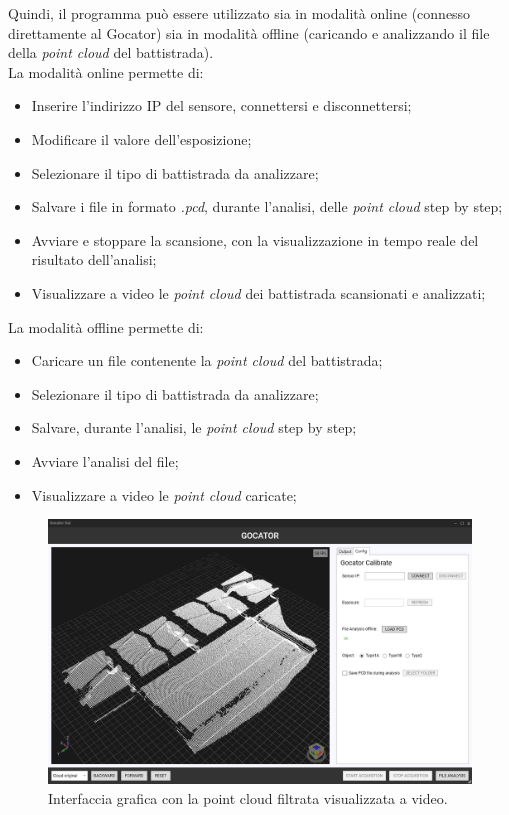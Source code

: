 \noindent Quindi, il programma può essere utilizzato sia in modalità online (connesso direttamente al Gocator) sia in modalità offline (caricando e analizzando il file della \textit{point cloud} del battistrada).\\
\newline
La modalità online permette di:

\begin{itemize}
	\item Inserire l'indirizzo IP del sensore, connettersi e disconnettersi;
	\item Modificare il valore dell'esposizione;
	\item Selezionare il tipo di battistrada da analizzare;
	\item Salvare i file in formato \textit{.pcd}, durante l'analisi, delle \textit{point cloud} step by step;
	\item Avviare e stoppare la scansione, con la visualizzazione in tempo reale del risultato dell'analisi;
	\item Visualizzare a video le \textit{point cloud} dei battistrada scansionati e analizzati;
\end{itemize}

\noindent La modalità offline permette di:

\begin{itemize}
	\item Caricare un file contenente la \textit{point cloud} del battistrada;
	\item Selezionare il tipo di battistrada da analizzare;
	\item Salvare, durante l'analisi, le \textit{point cloud} step by step;
	\item Avviare l'analisi del file;
	\item Visualizzare a video le \textit{point cloud} caricate;
\end{itemize}

\begin{figure}[H]
	\centering
	\includegraphics[width=0.9\columnwidth]{./pictures/gui_3.png}
	\caption{Interfaccia grafica con la point cloud filtrata visualizzata a video.}\label{fig:gui_2}
\end{figure}

